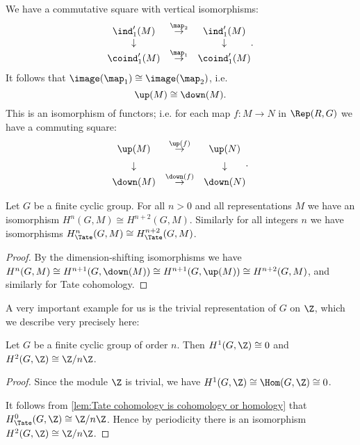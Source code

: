 \begin{definition} \label{def:up iso down}
We have a commutative square with vertical isomorphisms:
	\[
		\begin{matrix}
			\ind_1'(M) & \stackrel{\map_2}\to & \ind_1'(M) \\
			\downarrow && \downarrow \\
			\coind_1'(M) & \stackrel{\map_1}\to & \coind_1'(M) \\
		\end{matrix}.
	\]
	It follows that $\image(\map_1) \cong \image(\map_2)$,
	i.e.
	\[
		\up(M) \cong \down(M).
	\]
	This is an isomorphism of functors; i.e. for each map $f : M \to N$ in $\Rep(R,G)$
	we have a commuting square:
	\[
		\begin{matrix}
			\up(M) & \stackrel{\up(f)}\to & \up(N) \\[2mm]
			\downarrow && \downarrow \\
			\down(M) & \stackrel{\down(f)}\to & \down(N)
		\end{matrix}.
	\]
\end{definition}

\begin{corollary} \label{cor:periodic cohomology}
	Let $G$ be a finite cyclic group.
	For all $n > 0$ and all representations $M$
	we have an isomorphism $H^{n}(G,M) \cong H^{n+2}(G,M)$.
	Similarly for all integers $n$ we have isomorphisms $H^{n}_{\Tate}(G,M) \cong H^{n+2}_{\Tate}(G,M)$.
\end{corollary}

\begin{proof}
	By the dimension-shifting isomorphisms we have
	$H^{n}(G,M) \cong H^{n+1}(G,\down(M)) \cong H^{n+1}(G,\up(M)) \cong H^{n+2}(G,M)$,
	and similarly for Tate cohomology.
\end{proof}

A very important example for us is the trivial representation of $G$ on $\Z$, which we describe
very precisely here:

\begin{lemma} \label{lem:H2 cyclic Z}
	\leanok

	Let $G$ be a finite cyclic group of order $n$.
	Then $H^1(G,\Z) \cong 0$ and $H^2(G,\Z) \cong \Z/n\Z$.
\end{lemma}
\begin{proof}
	\leanok

	Since the module $\Z$ is trivial, we have $H^1(G,\Z)\cong \Hom(G,\Z) \cong 0$.

	It follows from \ref{lem:Tate cohomology is cohomology or homology}
	that $H^0_{\Tate}(G,\Z) \cong \Z /n\Z$.
	Hence by periodicity there is an isomorphism $H^2(G,\Z) \cong \Z/ n\Z$.
\end{proof}


